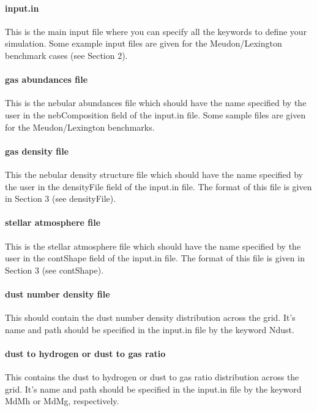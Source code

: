 \documentclass[11pt]{article}
\begin{document}
\paragraph{    input.in }
    This is the main input file where you can specify all the keywords to define
    your simulation. Some example input files are given for the Meudon/Lexington
    benchmark cases (see Section 2).  

\paragraph{     gas abundances file}
    This is the nebular abundances file which should have the name specified by
    the user in the nebComposition field of the input.in file. Some sample files 
    are given for the Meudon/Lexington benchmarks.
    
\paragraph{     gas density file}
    This the nebular density structure file which should have the name specified by
    the user in the densityFile field of the input.in file. The format of this file
    is given in Section 3 (see densityFile). 

\paragraph{     stellar atmosphere file}
    This is the stellar atmosphere file which should have the name specified by
    the user in the contShape field of the input.in file. The format of this file 
    is given in Section 3 (see contShape). 

\paragraph{     dust number density file}
    This should contain the dust number density distribution across the grid. 
    It's name and path should be specified in the input.in file by the keyword 
    Ndust. 

\paragraph{     dust to hydrogen or dust to gas ratio}
    This contains the dust to hydrogen or dust to gas ratio distribution across 
    the grid. It's name and path should be specified in the input.in file by the keyword 
    MdMh or MdMg, respectively. 
\end{document}
